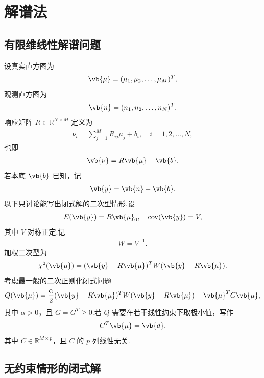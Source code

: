 \chapter{解谱法}

\section{有限维线性解谱问题}

设真实直方图为
\begin{align*}
	\vb{\mu}=(\mu_1,\mu_2,\ldots,\mu_M)^T,
\end{align*}
观测直方图为
\begin{align*}
	\vb{n}=(n_1,n_2,\ldots,n_N)^T.
\end{align*}
响应矩阵 \(R\in\mathbb{R}^{N\times M}\) 定义为
\begin{align*}
	\nu_i=\sum_{j=1}^{M}R_{ij}\mu_j+b_i,
	\quad i=1,2,\ldots,N,
\end{align*}
也即
\begin{align*}
	\vb{\nu}=R\vb{\mu}+\vb{b}.
\end{align*}
若本底 \(\vb{b}\) 已知，记
\begin{align*}
	\vb{y}=\vb{n}-\vb{b}.
\end{align*}
以下只讨论能写出闭式解的二次型情形.设
\begin{align*}
	E(\vb{y})=R\vb{\mu}_0,\quad
	\operatorname{cov}(\vb{y})=V,
\end{align*}
其中 \(V\) 对称正定.记
\begin{align*}
	W=V^{-1}.
\end{align*}
加权二次型为
\begin{align*}
	\chi^2(\vb{\mu})
	=(\vb{y}-R\vb{\mu})^TW(\vb{y}-R\vb{\mu}).
\end{align*}
考虑最一般的二次正则化闭式问题
\begin{align*}
	Q(\vb{\mu})
	=\frac{\alpha}{2}(\vb{y}-R\vb{\mu})^TW(\vb{y}-R\vb{\mu})
	+\vb{\mu}^TG\vb{\mu},
\end{align*}
其中 \(\alpha>0\)，且 \(G=G^T\geq0\).若 \(Q\) 需要在若干线性约束下取极小值，写作
\begin{align*}
	C^T\vb{\mu}=\vb{d},
\end{align*}
其中 \(C\in\mathbb{R}^{M\times p}\)，且 \(C\) 的 \(p\) 列线性无关.

\section{无约束情形的闭式解}

